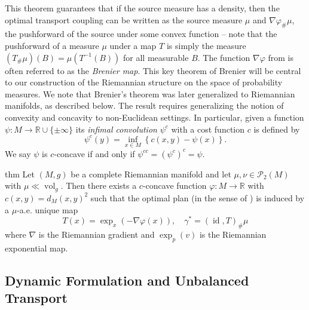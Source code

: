 \documentclass[11pt]{article}
\newcommand{\man}{M}
\begin{document}
This theorem guarantees that if the source measure has a density, then the optimal transport coupling can be written as the source measure $\mu$ and $\nabla \varphi_\#\mu$, the pushforward of the source under some convex function -- note that the pushforward of a measure $\mu$ under a map $T$ is simply the measure $(T_\#\mu) (B) = \mu(T^{-1}(B))$ for all measurable $B$. The function $\nabla\varphi$ from  is often referred to as the \textit{Brenier map}. This key theorem of Brenier will be central to our construction of the Riemannian structure on the space of probability measures. We note that Brenier's theorem was later generalized to Riemannian manifolds, as described below. The result requires generalizing the notion of convexity and concavity to non-Euclidean settings. In particular, given a function $\psi: M \rightarrow \mathbb{R} \cup \{\pm \infty\}$ its \textit{infimal convolution} $\psi^c$ with a cost function $c$ is defined by 
\[\psi^c(y) = \inf_{x \in M}\left\{c(x,y) - \psi(x)\right\}.\]
We say $\psi$ is $c$-concave if and only if $\psi^{cc} = (\psi^c)^c = \psi.$

\begin{restatable}{thm}{} \label{brenier-mcann}
    Let $(M, g)$ be a complete Riemannian manifold and let $\mu, \nu \in \mathcal{P}_2(\man)$ with $\mu \ll \operatorname{vol}_g$. Then there exists a $c$-concave function $\varphi: \man \rightarrow \mathbb{R}$ with $c(x,y) = d_M(x,y)^2$ such that the optimal plan (in the sense of ) is induced by a $\mu$-a.e. unique map
    \[T(x) = \exp_x\left(-\nabla\varphi(x)\right), \quad \gamma^* = (\operatorname{id}, T)_\# \mu\]
    where $\nabla$ is the Riemannian gradient and $\exp_p(v)$ is the Riemannian exponential map.
\end{restatable}

\subsection{Dynamic Formulation and Unbalanced Transport}
\end{document}
